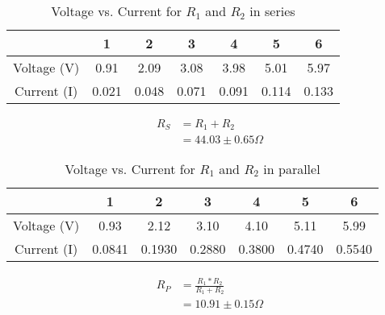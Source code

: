 \documentclass[a4paper]{article}
\begin{document}
\begin{table}[h!]
  \begin{center}
    \caption{Voltage vs. Current for \(R_1\) and \(R_2\) in series}\label{tab:table1}
    \begin{tabular}{|c|c|c|c|c|c|c|}\hline
      & 1 & 2 & 3 & 4 & 5 & 6 \\ \hline
      Voltage (V) & 0.91 & 2.09 & 3.08 & 3.98 & 5.01 & 5.97 \\ \hline
      Current (I) & 0.021 & 0.048 & 0.071 & 0.091 & 0.114 & 0.133 \\ \hline
    \end{tabular}
  \end{center}
  \begin{center}
    \begin{equation}
      \begin{split}
        R_S &= R_1 + R_2 \\
            &= \boxed{44.03 \pm 0.65 \Omega}
      \end{split}
    \end{equation}
  \end{center}
\end{table}

\begin{table}[h!]
  \begin{center}
    \caption{Voltage vs. Current for \(R_1\) and \(R_2\) in parallel}\label{tab:table1}
    \begin{tabular}{|c|c|c|c|c|c|c|}\hline
      & 1 & 2 & 3 & 4 & 5 & 6 \\ \hline
      Voltage (V) & 0.93 & 2.12 & 3.10 & 4.10 & 5.11 & 5.99 \\ \hline
      Current (I) & 0.0841 & 0.1930 & 0.2880 & 0.3800 & 0.4740 & 0.5540 \\ \hline
    \end{tabular}
  \end{center}
  \begin{center}
    \begin{equation}
      \begin{split}
        R_P &= \frac{R_1 * R_2}{R_1 + R_2} \\
            &= \boxed{10.91 \pm 0.15 \Omega}
      \end{split}
    \end{equation}
  \end{center}
\end{table}
\end{document}
